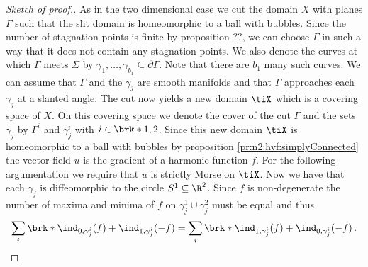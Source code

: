 \begin{proof}[Sketch of proof.]
  As in the two dimensional case we cut the domain $X$ with planes $\Gamma$ such that the slit domain is
  homeomorphic to a ball with bubbles.
  Since the number of stagnation points is finite by proposition ??, we can choose $\Gamma$ in such a way
  that it does not contain any stagnation points. We also denote the curves at which $\Gamma$ meets $\Sigma$ by 
  $\gamma_1,\dots,\gamma_{b_1}\subseteq\partial\Gamma$. Note that there are $b_1$ many such curves.
  We can assume that $\Gamma$ and the $\gamma_j$ are smooth manifolds and that $\Gamma$ approaches
  each $\gamma_j$ at a slanted angle.
  The cut now yields a new domain $\tiX$ which is a covering space of $X$.
  On this covering space we denote the cover of the cut $\Gamma$ and the sets $\gamma_j$ by
  $\Gamma^i$ and $\gamma_j^i$ with $i\in\brk*{1,2}$.
  Since this new domain $\tiX$ is homeomorphic to a ball with bubbles by proposition \ref{pr:n2:hvf:simplyConnected}
  the vector field $u$ is the gradient of a harmonic function $f$.
  For the following argumentation we require that $u$ is strictly Morse on $\tiX$.
  Now we have that each $\gamma_j$ is diffeomorphic to the circle $S^1\subseteq\R^2$.
  Since $f$ is non-degenerate the number of maxima and minima of $f$ on $\gamma_j^1\cup\gamma_j^2$ must be equal and thus
  \begin{align}
    \sum_i\brk*{\ind_{0,\gamma_j^i}(f)+\ind_{1,\gamma_j^i}(-f)}=\sum_i\brk*{\ind_{1,\gamma_j^i}(f)+\ind_{0,\gamma_j^i}(-f)}\,.
    \label{eq:n3_hvf_noInflowNoOutflow_maxMinRel}
  \end{align}


\end{proof}
